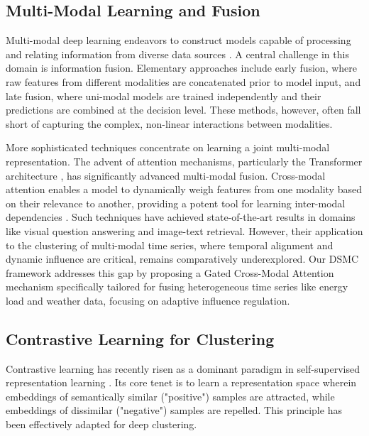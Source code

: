 \documentclass[journal]{IEEEtran}
\begin{document}
\subsection{Multi-Modal Learning and Fusion}
Multi-modal deep learning endeavors to construct models capable of processing and relating information from diverse data sources \cite{multi_modal_deep_learning_survey}. A central challenge in this domain is information fusion. Elementary approaches include early fusion, where raw features from different modalities are concatenated prior to model input, and late fusion, where uni-modal models are trained independently and their predictions are combined at the decision level. These methods, however, often fall short of capturing the complex, non-linear interactions between modalities.

More sophisticated techniques concentrate on learning a joint multi-modal representation. The advent of attention mechanisms, particularly the Transformer architecture \cite{attention_is_all_you_need}, has significantly advanced multi-modal fusion. Cross-modal attention enables a model to dynamically weigh features from one modality based on their relevance to another, providing a potent tool for learning inter-modal dependencies \cite{cross_modal_attention_survey}. Such techniques have achieved state-of-the-art results in domains like visual question answering and image-text retrieval. However, their application to the clustering of multi-modal time series, where temporal alignment and dynamic influence are critical, remains comparatively underexplored. Our DSMC framework addresses this gap by proposing a Gated Cross-Modal Attention mechanism specifically tailored for fusing heterogeneous time series like energy load and weather data, focusing on adaptive influence regulation.

\subsection{Contrastive Learning for Clustering}
Contrastive learning has recently risen as a dominant paradigm in self-supervised representation learning \cite{contrastive_learning_chen}. Its core tenet is to learn a representation space wherein embeddings of semantically similar ("positive") samples are attracted, while embeddings of dissimilar ("negative") samples are repelled. This principle has been effectively adapted for deep clustering.
\end{document}
